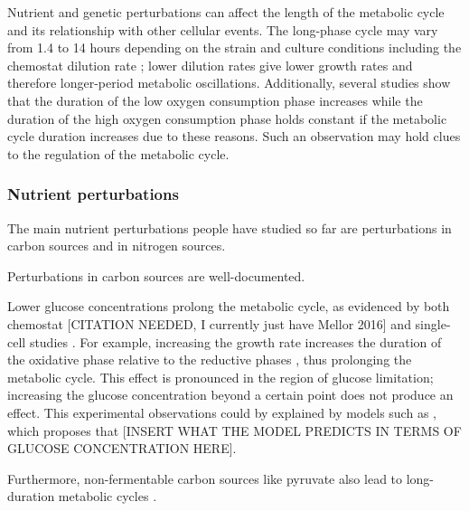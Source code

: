 Nutrient and genetic perturbations can affect the length of the metabolic cycle and its relationship with other cellular events.
The long-phase cycle may vary from 1.4 to 14 hours depending on the strain and culture conditions including the chemostat dilution rate \citep{caustonMetabolicRhythmsFramework2018};
lower dilution rates give lower growth rates and therefore longer-period metabolic oscillations.
Additionally, several studies \citep{slavovCouplingGrowthRate2011,oneillEukaryoticCellBiology2020} show that the duration of the low oxygen consumption phase increases while the duration of the high oxygen consumption phase holds constant if the metabolic cycle duration increases due to these reasons.
Such an observation may hold clues to the regulation of the metabolic cycle.

\subsubsection{Nutrient perturbations}
\label{subsubsec:intro-ymc-perturbations-nutrient}

The main nutrient perturbations people have studied so far are perturbations in carbon sources and in nitrogen sources.

Perturbations in carbon sources are well-documented.

Lower glucose concentrations prolong the metabolic cycle, as evidenced by both chemostat [CITATION NEEDED, I currently just have Mellor 2016] and single-cell studies \parencite{papagiannakisAutonomousMetabolicOscillations2017}.
For example, increasing the growth rate increases the duration of the oxidative phase relative to the reductive phases \citep{slavovCouplingGrowthRate2011}, thus prolonging the metabolic cycle.
This effect is pronounced in the region of glucose limitation;
increasing the glucose concentration beyond a certain point does not produce an effect.
This experimental observations could by explained by models such as \textcite{jonesCyberneticModelGrowth1999}, which proposes that [INSERT WHAT THE MODEL PREDICTS IN TERMS OF GLUCOSE CONCENTRATION HERE].

Furthermore, non-fermentable carbon sources like pyruvate also lead to long-duration metabolic cycles \parencite{papagiannakisAutonomousMetabolicOscillations2017}.

